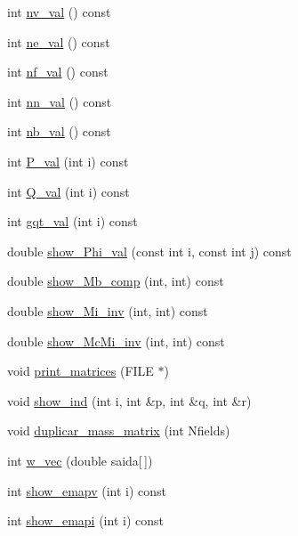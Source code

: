 \begin{DoxyCompactItemize}
\item 
int \hyperlink{classStdel_ae2ab461d1bc8d9f6006665fe03684845}{nv\+\_\+val} () const
\item 
int \hyperlink{classStdel_aa45f211663f5e8e47fdea32232ff23ea}{ne\+\_\+val} () const
\item 
int \hyperlink{classStdel_a2eed3ce0b73050e868989be78d918e5c}{nf\+\_\+val} () const
\item 
int \hyperlink{classStdel_a6086dceed8fe3dd410da0d6b84f02377}{nn\+\_\+val} () const
\item 
int \hyperlink{classStdel_a4fb0a049dc27d8e67665a56d1b5a18ba}{nb\+\_\+val} () const
\item 
int \hyperlink{classStdel_a701c7d5595d4f6632333c4202898983b}{P\+\_\+val} (int i) const
\item 
int \hyperlink{classStdel_aeea4659f5bcabbf1acb374180c43a293}{Q\+\_\+val} (int i) const
\item 
int \hyperlink{classStdel_a0775d0c4f7f15ae26bd45fc949e6f6b9}{gqt\+\_\+val} (int i) const
\item 
double \hyperlink{classStdel_a6565c36150823a1f52a2daf05806f7a4}{show\+\_\+\+Phi\+\_\+val} (const int i, const int j) const
\item 
double \hyperlink{classStdel_a4860f0f650640f859c5f75c206ee1f60}{show\+\_\+\+Mb\+\_\+comp} (int, int) const
\item 
double \hyperlink{classStdel_a11bf2897170ada9a9dd8f641a39585e5}{show\+\_\+\+Mi\+\_\+inv} (int, int) const
\item 
double \hyperlink{classStdel_a44d5aa234e02fb41afd5a4e5e45fadc4}{show\+\_\+\+Mc\+Mi\+\_\+inv} (int, int) const
\item 
void \hyperlink{classStdel_a319e6a16011b22e12028a841b7686f03}{print\+\_\+matrices} (F\+I\+LE $\ast$)
\item 
void \hyperlink{classStdel_a20afd536025caf1aad1c4e3f41fcb866}{show\+\_\+ind} (int i, int \&p, int \&q, int \&r)
\item 
void \hyperlink{classStdel_a922b779be1f8f12b7a5535ab529bff64}{duplicar\+\_\+mass\+\_\+matrix} (int Nfields)
\item 
int \hyperlink{classStdel_a395c8d7d7890a9efdea23932fa22b420}{w\+\_\+vec} (double saida\mbox{[}$\,$\mbox{]})
\item 
int \hyperlink{classStdel_ad474ffc52b051ae8317b3fdb583c4c98}{show\+\_\+emapv} (int i) const
\item 
int \hyperlink{classStdel_aca7fb885191a952c013e930521a42213}{show\+\_\+emapi} (int i) const
\item 

\end{DoxyCompactItemize}

